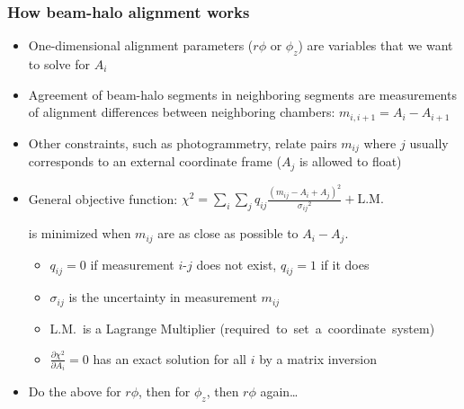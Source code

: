 \documentclass[compress]{beamer}
\begin{document}
\begin{frame}
\frametitle{How beam-halo alignment works}
\begin{itemize}
\item One-dimensional alignment parameters ($r\phi$ or $\phi_z$) are variables that we want to solve for $A_i$
\item Agreement of beam-halo segments in neighboring segments are measurements of alignment differences between neighboring chambers: $m_{i,i+1} = A_i - A_{i+1}$
\item Other constraints, such as photogrammetry, relate pairs $m_{ij}$ where $j$ usually corresponds to an external coordinate frame ($A_j$ is allowed to float)
\item General objective function: $\displaystyle \chi^2 = \sum_i \sum_j q_{ij} \frac{(m_{ij} - A_i + A_j)^2}{{\sigma_{ij}}^2} + \mbox{L.M.}$

is minimized when $m_{ij}$ are as close as possible to $A_i - A_j$.

\begin{itemize}
\item $q_{ij} = 0$ if measurement $i$-$j$ does not exist, $q_{ij} = 1$ if it does

\item $\sigma_{ij}$ is the uncertainty in measurement $m_{ij}$

\item L.M.~is a Lagrange Multiplier \mbox{(required to set a coordinate system)\hspace{-1 cm}}

\item $\frac{\partial \chi^2}{\partial A_i} = 0$ has an exact solution for all $i$ by a matrix inversion
\end{itemize}

\item Do the above for $r\phi$, then for $\phi_z$, then $r\phi$ again\ldots
\end{itemize}
\end{frame}
\end{document}
